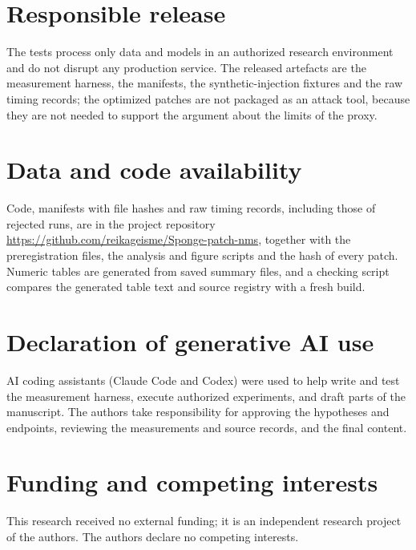 \documentclass[a4paper,fleqn]{cas-dc}
\begin{document}
\section*{Responsible release}
The tests process only data and models in an authorized research environment and do not disrupt any production service. The released artefacts are the measurement harness, the manifests, the synthetic-injection fixtures and the raw timing records; the optimized patches are not packaged as an attack tool, because they are not needed to support the argument about the limits of the proxy.

\section*{Data and code availability}
Code, manifests with file hashes and raw timing records, including those of rejected runs, are in the project repository \url{https://github.com/reikageisme/Sponge-patch-nms}, together with the preregistration files, the analysis and figure scripts and the hash of every patch. Numeric tables are generated from saved summary files, and a checking script compares the generated table text and source registry with a fresh build.

\section*{Declaration of generative AI use}
AI coding assistants (Claude Code and Codex) were used to help write and test the measurement harness, execute authorized experiments, and draft parts of the manuscript. The authors take responsibility for approving the hypotheses and endpoints, reviewing the measurements and source records, and the final content.

\section*{Funding and competing interests}
This research received no external funding; it is an independent research project of the authors. The authors declare no competing interests.

\appendix
\end{document}
